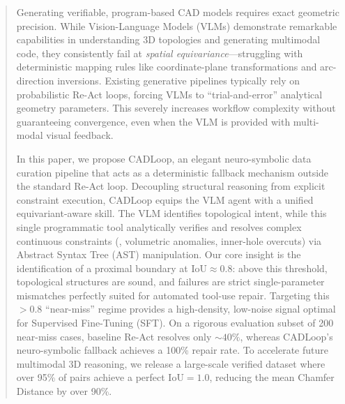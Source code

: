 \begin{abstract}
Generating verifiable, program-based CAD models requires exact geometric precision.
While Vision-Language Models (VLMs) demonstrate remarkable capabilities in understanding
3D topologies and generating multimodal code, they consistently fail at \emph{spatial
equivariance}---struggling with deterministic mapping rules like coordinate-plane
transformations and arc-direction inversions.
Existing generative pipelines typically rely on probabilistic Re-Act loops, forcing VLMs
to ``trial-and-error'' analytical geometry parameters.
This severely increases workflow complexity without guaranteeing convergence, even when the
VLM is provided with multi-modal visual feedback.

In this paper, we propose CADLoop, an elegant neuro-symbolic data curation
pipeline that acts as a deterministic fallback mechanism outside the standard Re-Act loop.
Decoupling structural reasoning from explicit constraint execution, CADLoop equips the VLM
agent with a unified equivariant-aware skill.
The VLM identifies topological intent, while this single programmatic tool analytically
verifies and resolves complex continuous constraints (\eg, volumetric anomalies,
inner-hole overcuts) via Abstract Syntax Tree (AST) manipulation.
Our core insight is the identification of a proximal boundary at
$\text{IoU} \approx 0.8$: above this threshold, topological structures are sound, and
failures are strict single-parameter mismatches perfectly suited for automated tool-use
repair.
Targeting this $>0.8$ ``near-miss'' regime provides a high-density, low-noise signal
optimal for Supervised Fine-Tuning (SFT).
On a rigorous evaluation subset of 200 near-miss cases, baseline Re-Act resolves only
${\sim}40\%$, whereas CADLoop's neuro-symbolic fallback achieves a 100\% repair
rate.
To accelerate future multimodal 3D reasoning, we release a large-scale verified dataset
where over 95\% of pairs achieve a perfect $\text{IoU} = 1.0$, reducing the mean
Chamfer Distance by over 90\%.
\end{abstract}
